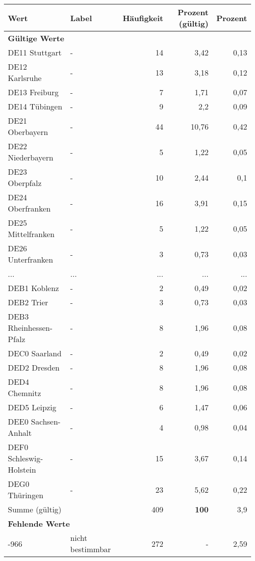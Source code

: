      \begin{longtable}{Xlrrr}
     \toprule
     \textbf{Wert} & \textbf{Label} & \textbf{Häufigkeit} & \textbf{Prozent (gültig)} & \textbf{Prozent} \\
     \endhead
     \midrule
     \multicolumn{5}{l}{\textbf{Gültige Werte}}\\
        \multicolumn{1}{X}{DE11 Stuttgart} & - & 14 & 3,42 & 0,13 \\
        \multicolumn{1}{X}{DE12 Karlsruhe} & - & 13 & 3,18 & 0,12 \\
        \multicolumn{1}{X}{DE13 Freiburg} & - & 7 & 1,71 & 0,07 \\
        \multicolumn{1}{X}{DE14 Tübingen} & - & 9 & 2,2 & 0,09 \\
        \multicolumn{1}{X}{DE21 Oberbayern} & - & 44 & 10,76 & 0,42 \\
        \multicolumn{1}{X}{DE22 Niederbayern} & - & 5 & 1,22 & 0,05 \\
        \multicolumn{1}{X}{DE23 Oberpfalz} & - & 10 & 2,44 & 0,1 \\
        \multicolumn{1}{X}{DE24 Oberfranken} & - & 16 & 3,91 & 0,15 \\
        \multicolumn{1}{X}{DE25 Mittelfranken} & - & 5 & 1,22 & 0,05 \\
        \multicolumn{1}{X}{DE26 Unterfranken} & - & 3 & 0,73 & 0,03 \\
       ... & ... & ... & ... & ... \\
        \multicolumn{1}{X}{DEB1 Koblenz} & - & 2 & 0,49 & 0,02 \\
        \multicolumn{1}{X}{DEB2 Trier} & - & 3 & 0,73 & 0,03 \\
        \multicolumn{1}{X}{DEB3 Rheinhessen-Pfalz} & - & 8 & 1,96 & 0,08 \\
        \multicolumn{1}{X}{DEC0 Saarland} & - & 2 & 0,49 & 0,02 \\
        \multicolumn{1}{X}{DED2 Dresden} & - & 8 & 1,96 & 0,08 \\
        \multicolumn{1}{X}{DED4 Chemnitz} & - & 8 & 1,96 & 0,08 \\
        \multicolumn{1}{X}{DED5 Leipzig} & - & 6 & 1,47 & 0,06 \\
        \multicolumn{1}{X}{DEE0 Sachsen-Anhalt} & - & 4 & 0,98 & 0,04 \\
        \multicolumn{1}{X}{DEF0 Schleswig-Holstein} & - & 15 & 3,67 & 0,14 \\
        \multicolumn{1}{X}{DEG0 Thüringen} & - & 23 & 5,62 & 0,22 \\
     \midrule
      \multicolumn{2}{l}{Summe (gültig)} & 409 &
      \textbf{100} &
         3,9 \\
     \multicolumn{5}{l}{\textbf{Fehlende Werte}}\\
       -966 & nicht bestimmbar & 272 & - & 2,59 \\


\end{longtable}
